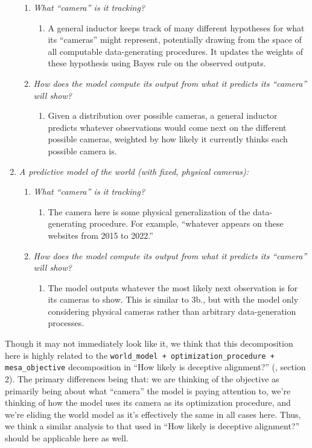 \documentclass[
  onecolumn,
  natbib,
]{miri-tech-article}
\begin{document}
\begin{enumerate}
\begin{enumerate}
    \item \textit{What ``camera'' is it tracking?}
        \begin{enumerate}
        \item A general inductor keeps track of many different hypotheses for what its ``cameras'' might represent, potentially drawing from the space of all computable data-generating procedures. It updates the weights of these hypothesis using Bayes rule on the observed outputs.
        \end{enumerate}
    \item \textit{How does the model compute its output from what it predicts its ``camera'' will show?}
        \begin{enumerate}
        \item Given a distribution over possible cameras, a general inductor predicts whatever observations would come next on the different possible cameras, weighted by how likely it currently thinks each possible camera is.
        \end{enumerate}
    \end{enumerate}
\item \textit{A predictive model of the world (with fixed, physical cameras):}
    \begin{enumerate}
    \item \textit{What ``camera'' is it tracking?}
        \begin{enumerate}
        \item The camera here is some physical generalization of the data-generating procedure. For example, ``whatever appears on these websites from 2015 to 2022.''
        \end{enumerate}
    \item \textit{How does the model compute its output from what it predicts its ``camera'' will show?}
        \begin{enumerate}
        \item The model outputs whatever the most likely next observation is for its cameras to show. This is similar to 3b., but with the model only considering physical cameras rather than arbitrary data-generation processes.
        \end{enumerate}
    \end{enumerate}
\end{enumerate}

Though it may not immediately look like it, we think that this decomposition here is highly related to the \texttt{world\_model + optimization\_procedure + mesa\_objective} decomposition in ``How likely is deceptive alignment?'' (\cite{how_likely_deception}, section 2). The primary differences being that: we are thinking of the objective as primarily being about what ``camera'' the model is paying attention to, we're thinking of how the model uses its camera as its optimization procedure, and we're eliding the world model as it's effectively the same in all cases here. Thus, we think a similar analysis to that used in ``How likely is deceptive alignment?'' should be applicable here as well.
\end{document}
